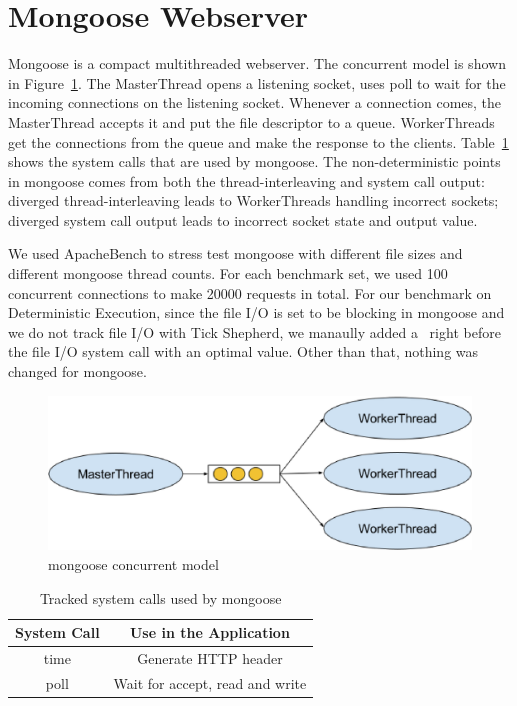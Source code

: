 \section{Mongoose Webserver}

Mongoose is a compact multithreaded webserver. The concurrent model is shown in Figure~\ref{f:mongoose_model}. The MasterThread opens a listening socket, uses poll to wait for the incoming connections on the listening socket. Whenever a connection comes, the MasterThread accepts it and put the file descriptor to a queue. WorkerThreads get the connections from the queue and make the response to the clients. Table~\ref{t:mongoose_syscall} shows the system calls that are used by mongoose. The non-deterministic points in mongoose comes from both the thread-interleaving and system call output: diverged thread-interleaving leads to WorkerThreads handling incorrect sockets; diverged system call output leads to incorrect socket state and output value.

We used ApacheBench to stress test mongoose with different file sizes and different mongoose thread counts. For each benchmark set, we used 100 concurrent connections to make 20000 requests in total. For our benchmark on Deterministic Execution, since the file I/O is set to be blocking in mongoose and we do not track file I/O with Tick Shepherd, we manaully added a \dettick\ right before the file I/O system call with an optimal value. Other than that, nothing was changed for mongoose.

\begin{figure}
\centering
\includegraphics[width=0.6\columnwidth]{figures/mongoose_model}
\caption{mongoose concurrent model}
\label{f:mongoose_model}
\end{figure}


\begin{table}
\caption{Tracked system calls used by mongoose}
\begin{center}
 \begin{tabular}{c | c}
System Call & Use in the Application\\ \hline
 time & Generate HTTP header  \\ \hline
 poll & Wait for accept, read and write
 \end{tabular}
\end{center}
\label{t:mongoose_syscall}
\end{table}

